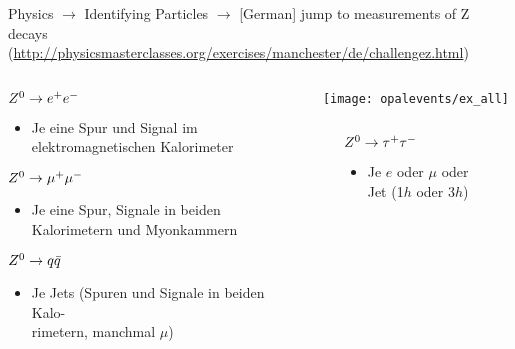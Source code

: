  \begin{frame}
   {\small Physics $\rightarrow$ Identifying Particles $\rightarrow$ [German] jump to measurements of Z decays}
   {\footnotesize (\url{http://physicsmasterclasses.org/exercises/manchester/de/challengez.html})}
   \vskip-0.2cm
   \begin{columns}
     \begin{column}{0.4\textwidth}
       \begin{block}{$Z^{0}\rightarrow e^{+}e^{-}$}
         \begin{itemize}
         \item Je eine Spur und Signal im elektromagnetischen Kalorimeter
         \end{itemize}
       \end{block}
       \begin{block}{$Z^{0}\rightarrow \mu^{+}\mu^{-}$}
         \begin{itemize}
         \item Je eine Spur, Signale in beiden Kalorimetern und Myonkammern
         \end{itemize}
       \end{block}
       \begin{block}{$Z^{0}\rightarrow q\bar{q}$}
         \begin{itemize}
         \item Je Jets (Spuren und Signale in beiden Kalo-\\rimetern,
           manchmal $\mu$)
         \end{itemize}
       \end{block}
    \end{column}
     \begin{column}{0.6\textwidth}
       \centering
       \texttt{[image: opalevents/ex\_all]}
       \vskip0.2cm
       \begin{columns}
         \begin{column}{0.05\textwidth}
         \end{column}
         \begin{column}{0.9\textwidth}
           \begin{block}{$Z^{0}\rightarrow \tau^{+}\tau^{-}$}
             \begin{itemize}
             \item Je $e$ oder $\mu$ oder Jet (1$h$ oder 3$h$)
             \end{itemize}
           \end{block}
         \end{column}
         \begin{column}{0.05\textwidth}
         \end{column}
       \end{columns}
     \end{column}
  \end{columns}
 \end{frame}
